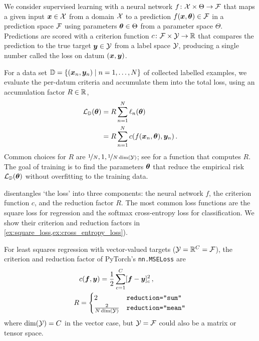 We consider supervised learning with a neural network $f\colon {\mathcal{X}} \times \Theta \to {\mathcal{F}}$ that maps a given input ${\bm{x}} \in {\mathcal{X}}$ from a domain ${\mathcal{X}}$ to a prediction $f({\bm{x}}, {\bm{\theta}}) \in {\mathcal{F}}$ in a prediction space ${\mathcal{F}}$ using parameters ${\bm{\theta}} \in \Theta$ from a parameter space $\Theta$.
Predictions are scored with a criterion function $c\colon {\mathcal{F}} \times {\mathcal{Y}} \to {\mathbb{R}}$ that compares the prediction to the true target ${\bm{y}} \in {\mathcal{Y}}$ from a label space ${\mathcal{Y}}$, producing a single number called the loss on datum $({\bm{x}}, {\bm{y}})$.

For a data set ${\mathbb{D}} = \{({\bm{x}}_n, {\bm{y}}_n) \mid n=1, \dots, N\}$ of collected labelled examples, we evaluate the per-datum criteria and accumulate them into the total loss, using an accumulation factor $R \in {\mathbb{R}}$,
\begin{align}\label{eq:empirical_risk}
  \begin{split}
    {\mathcal{L}}_{{\mathbb{D}}}({\bm{\theta}}) & = R \sum_{n=1}^N \ell_n({\bm{\theta}})
    \\
                       & = R \sum_{n=1}^N c(f({\bm{x}}_n, {\bm{\theta}}), {\bm{y}}_n)\,.
  \end{split}
\end{align}
Common choices for $R$ are $\nicefrac{1}{N}, 1, \nicefrac{1}{N \dim({\mathcal{Y}})}$; see  for a function that computes $R$.
The goal of training is to find the parameters ${\bm{\theta}}$ that reduce the empirical risk ${\mathcal{L}}_{{\mathbb{D}}}({\bm{\theta}})$ without overfitting to the training data.

 disentangles `the loss' into three components: the neural network $f$, the criterion function $c$, and the reduction factor $R$.
The most common loss functions are the square loss for regression and the softmax cross-entropy loss for classification.
We show their criterion and reduction factors in \cref{ex:square_loss,ex:cross_entropy_loss}).

\switchcolumn[1]
\begin{example}\label{ex:square_loss}
  For least squares regression with vector-valued targets (${\mathcal{Y}} = {\mathbb{R}}^C = {\mathcal{F}}$), the criterion and reduction factor of PyTorch's \texttt{nn.MSELoss} are
  \begin{align*}
    &c({\bm{f}}, {\bm{y}})
      =
      \frac{1}{2}\sum_{c=1}^C [{\bm{f}} - {\bm{y}}]_c^2\,,
    \\
    R
    &=
      \begin{cases}
        2                     & \text{\texttt{reduction="sum"}}
        \\
        \frac{2}{N \dim({\mathcal{Y}})} & \text{\texttt{reduction="mean"}}
      \end{cases}
  \end{align*}
  where $\dim({\mathcal{Y}}) = C$ in the vector case, but ${\mathcal{Y}} = {\mathcal{F}}$ could also be a matrix or tensor space.
\end{example}


